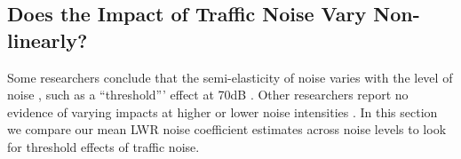 \documentclass{article}\usepackage{graphicx, color}
\begin{document}
% 
% 
% 

\subsection{Does the Impact of Traffic Noise Vary Non-linearly?}

Some researchers conclude that the semi-elasticity of noise varies with the level of noise \citep{Andersson2010, MarmolejoDuarteCarlos;GonzalezTamez2009, Theebe2004a, Miedema2001, Wilhelmsson2000}, such as a ``threshold''' effect at 70dB \citep{Wilhelmsson2000, Cohen2009}. Other researchers report no evidence of varying impacts at higher or lower noise intensities \citep{Blanco2011, Baranzini2010, Kim2007, Huang;Palmquist2001}. In this section we compare our mean LWR noise coefficient estimates across noise levels to look for threshold effects of traffic noise.
\end{document}
